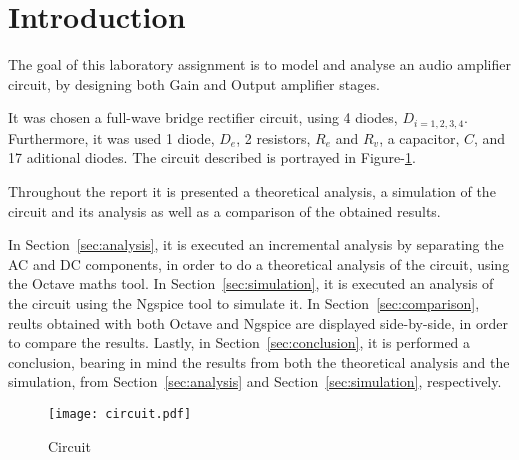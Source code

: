 \section{Introduction}
\label{sec:introduction}

The goal of this laboratory assignment is to model and analyse an audio amplifier
circuit, by designing both Gain and Output amplifier stages.\par

It was chosen a full-wave bridge rectifier circuit, using 4 diodes, $D_{i={1,2,3,4}}$.
Furthermore, it was used 1 diode, $D_e$, 2 resistors, $R_e$ and $R_v$, a capacitor,
$C$, and 17 aditional diodes. The circuit described is portrayed in Figure-\ref{fig:circuit}.\par

Throughout the report it is presented a theoretical analysis, a simulation of the
circuit and its analysis as well as a comparison of the obtained results. \par

In Section~\ref{sec:analysis}, it is executed an incremental analysis by separating
the AC and DC components, in order to do a theoretical analysis of the circuit,
using the Octave maths tool.
In Section~\ref{sec:simulation}, it is executed an analysis of the circuit using
the Ngspice tool to simulate it.
In Section~\ref{sec:comparison}, reults obtained with both Octave and Ngspice are
displayed side-by-side, in order to compare the results.
Lastly, in Section~\ref{sec:conclusion}, it is performed a conclusion, bearing in mind the
results from both the theoretical analysis and the simulation, from Section~\ref{sec:analysis}
and Section~\ref{sec:simulation}, respectively.\par


\begin{figure}[h] \centering
\texttt{[image: circuit.pdf]}
\caption{Circuit}
\label{fig:circuit}
\end{figure}

\newpage
